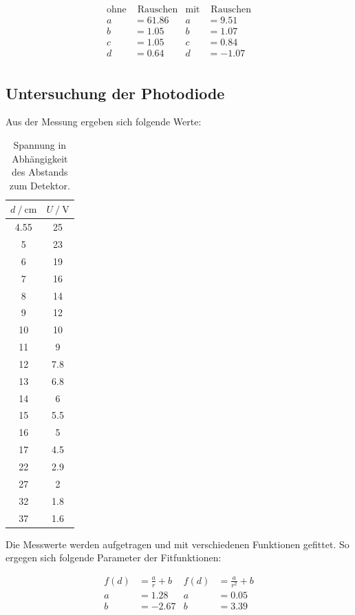 \begin{align*}
\text{ohne}&\text{ Rauschen} & \text{mit}& \text{ Rauschen} \\
a &= 61.86 & a &= 9.51\\
b &= 1.05  & b &= 1.07\\
c &= 1.05  & c &= 0.84\\
d &= 0.64  & d &= -1.07\\
\end{align*}

\noindent


\subsection{Untersuchung der Photodiode}
Aus der Messung ergeben sich folgende Werte:

\begin{table}
  \centering
  \begin{tabular}{c c}
  \toprule
  {$d \mathbin{/} \si{\centi\meter} $} & {$U \mathbin{/} \si{\volt} $}\\
  \midrule
  4.55 &   25\\
  5    &  23\\
  6    &  19\\
  7    &  16\\
  8    &  14\\
  9    &  12\\
  10   &   10\\
  11   &   9\\
  12   &   7.8\\
  13   &   6.8\\
  14   &   6\\
  15   &   5.5\\
  16   &   5\\
  17   &   4.5\\
  22   &   2.9\\
  27   &   2\\
  32   &   1.8\\
  37   &   1.6\\
  \bottomrule
  \end{tabular}
  \caption{Spannung in Abhängigkeit des Abstands zum Detektor.}
  \label{tab:led}
  \end{table}

\noindent
Die Messwerte werden aufgetragen und mit verschiedenen Funktionen gefittet.
So ergegen sich folgende Parameter der Fitfunktionen:

\begin{align*}
  f(d) &= \frac{a}{r} + b & f(d)&= \frac{a}{r^2} + b \\
  a &= 1.28   & a &= 0.05\\
  b &= -2.67  & b &= 3.39\\
  \end{align*}

